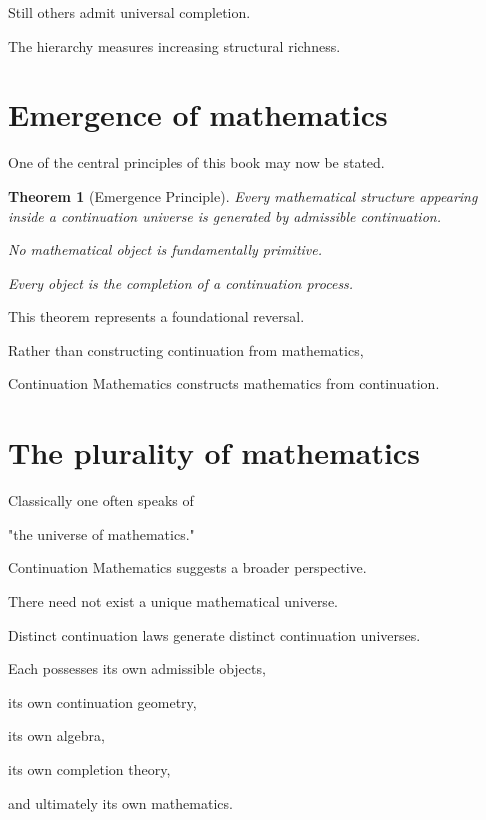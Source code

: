 \documentclass[13pt,openany]{book}
\theoremstyle{plain}
\newtheorem{theorem}{Theorem}[chapter]
\theoremstyle{definition}
\begin{document}
Still others admit universal completion.

The hierarchy measures increasing structural richness.


\section{Emergence of mathematics}

One of the central principles of this book may now be stated.

\begin{theorem}[Emergence Principle]

Every mathematical structure appearing inside a continuation universe is generated by admissible continuation.

No mathematical object is fundamentally primitive.

Every object is the completion of a continuation process.

\end{theorem}

This theorem represents a foundational reversal.

Rather than constructing continuation from mathematics,

Continuation Mathematics constructs mathematics from continuation.


\section{The plurality of mathematics}

Classically one often speaks of

"the universe of mathematics."

Continuation Mathematics suggests a broader perspective.

There need not exist a unique mathematical universe.

Distinct continuation laws generate distinct continuation universes.

Each possesses its own admissible objects,

its own continuation geometry,

its own algebra,

its own completion theory,

and ultimately its own mathematics.
\end{document}
